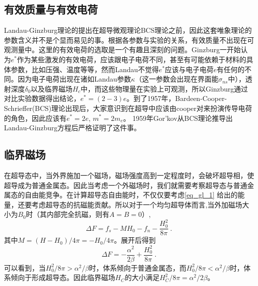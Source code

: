 \subsection{有效质量与有效电荷}
Landau-Ginzburg理论的提出在超导微观理论BCS理论之前，因此这套唯象理论的参数含义并不是个显而易见的事。根据各参数与实验的关系，有效质量不出现在可观测量中。这里的有效电荷的选取是一个有趣且深刻的问题。Ginzburg一开始认为$e^*$作为某些激发的有效电荷，应该跟电子电荷不同，甚至有可能依赖于材料的具体参数，比如压强、温度等等，然而Landau不觉得$e^*$应该与电子电荷$e$有任何的不同。因为电子电荷出现在诸如Landau参数$\kappa$（这一参数会出现在界面能$\sigma_{ns}$中），透射深度$\delta_0$以及临界磁场$H_c$中，而这些物理量在实验上可观测，所以Ginzburg通过对比实验数据得出结论，$e^* = (2-3)e$。到了1957年，Bardeen-Cooper-Schrieffer(BCS)理论出现后，大家意识到在超导中应该由cooper对来扮演传导电荷的角色，因此应该有$e^* = 2e$, $m^* = 2m_e$。 1959年Gor'kov从BCS理论推导出Landau-Ginzburg方程后严格证明了这件事。
\subsection{临界磁场}
在超导态中，当外界施加一个磁场，磁场强度高到一定程度时，会破坏超导相，使超导成为普通金属态。因此当考虑一个外磁场时，我们就需要考察超导态与普通金属态的自由能竞争。在计算超导态自由能时，不仅仅要考虑\autoref{eq_gl_1} 给出的能量，还要考虑超导态的抗磁能贡献。所以对于一个均匀超导体而言,当外加磁场大小为$B_0$时（其内部完全抗磁，则有$A=B=0$）,
\begin{equation}
\Delta F = f_s -M H_0 -f_n - \frac{H_0^2}{8\pi}~.
\end{equation}
其中$M = (H-H_0)/4\pi = -H_0/4\pi$。展开后得到
\begin{equation}
\Delta F = -\frac{\alpha^2}{2\beta} + \frac{H_0^2}{8\pi}~.
\end{equation}
可以看到，当$H_0^2/8\pi > \alpha^2/\beta$时，体系倾向于普通金属态，而$H_0^2/8\pi<\alpha^2/\beta$时，体系倾向于形成超导态。因此临界磁场$H_C$的大小满足$H_C^2/8\pi = \alpha^2/2\beta$。
